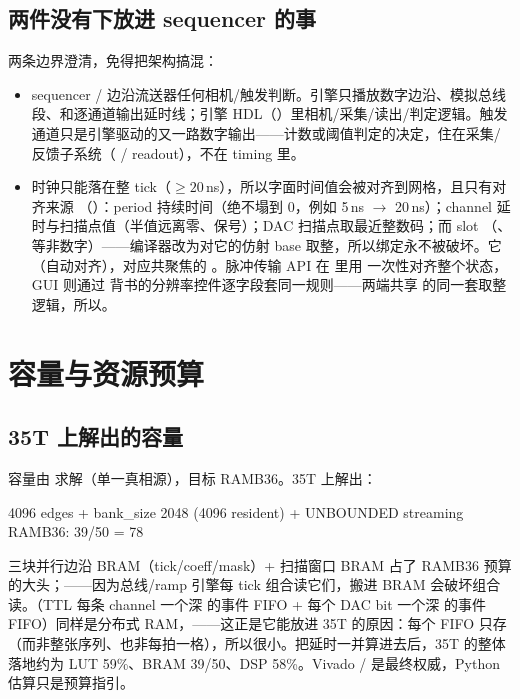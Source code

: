 \documentclass[11pt,oneside,openany]{book}
\begin{document}
\section{两件没有下放进 sequencer 的事}
两条边界澄清，免得把架构搞混：
\begin{itemize}
  \item {} sequencer / 边沿流送器任何相机/触发判断。引擎只播放数字边沿、模拟总线段、和逐通道输出延时线；引擎 HDL（）里相机/采集/读出/判定逻辑。触发通道只是引擎驱动的又一路数字输出——计数或阈值判定的决定，住在采集/反馈子系统（ / readout），不在 timing 里。
  \item {} 时钟只能落在整 tick（$\ge 20$\,ns），所以字面时间值会被对齐到网格，且只有对齐来源 （）：period 持续时间（绝不塌到 0，例如 5\,ns $\rightarrow$ 20\,ns）；channel 延时与扫描点值（半值远离零、保号）；DAC 扫描点取最近整数码；而 slot （、 等非数字）——编译器改为对它的仿射 base 取整，所以绑定永不被破坏。它（自动对齐），对应共聚焦的 。脉冲传输 API 在  里用  一次性对齐整个状态，GUI 则通过  背书的分辨率控件逐字段套同一规则——两端共享  的同一套取整逻辑，所以。
\end{itemize}

\chapter{容量与资源预算}

\section{35T 上解出的容量}
容量由  求解（单一真相源），目标  RAMB36。35T 上解出：

\begin{codeblock}
4096 edges + bank_size 2048 (4096 resident) + UNBOUNDED streaming
RAMB36: 39/50 = 78%
\end{codeblock}

三块并行边沿 BRAM（tick/coeff/mask）+ 扫描窗口 BRAM 占了 RAMB36 预算的大头；——因为总线/ramp 引擎每 tick 组合读它们，搬进 BRAM 会破坏组合读。（TTL 每条 channel 一个深  的事件 FIFO + 每个 DAC bit 一个深  的事件 FIFO）同样是分布式 RAM，——这正是它能放进 35T 的原因：每个 FIFO 只存（而非整张序列、也非每拍一格），所以很小。把延时一并算进去后，35T 的整体落地约为 LUT 59\%、BRAM 39/50、DSP 58\%。Vivado  /  是最终权威，Python 估算只是预算指引。
\end{document}
